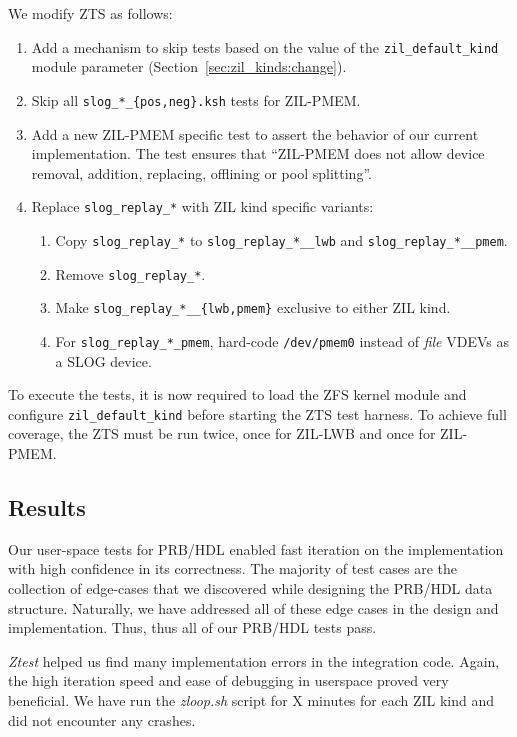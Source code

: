 \documentclass[12pt,a4paper,twoside]{book}
\begin{document}
We modify ZTS as follows:
\begin{enumerate}[noitemsep]
    \item Add a mechanism to skip tests based on the value of the \lstinline{zil_default_kind} module parameter (Section~\ref{sec:zil_kinds:change}).
    \item Skip all \lstinline|slog_*_{pos,neg}.ksh| tests for ZIL-PMEM.
    \item Add a new ZIL-PMEM specific test to assert the behavior of our current implementation.
        The test ensures that ``ZIL-PMEM does not allow device removal, addition, replacing, offlining or pool splitting''.
    \item Replace \lstinline{slog_replay_*} with ZIL kind specific variants:
        \begin{enumerate}
            \item Copy \lstinline{slog_replay_*} to \lstinline{slog_replay_*__lwb} and \lstinline{slog_replay_*__pmem}.
            \item Remove \lstinline{slog_replay_*}.
            \item Make \lstinline|slog_replay_*__{lwb,pmem}| exclusive to either ZIL kind.
            \item For \lstinline{slog_replay_*_pmem}, hard-code \lstinline{/dev/pmem0} instead of \textit{file} VDEVs as a SLOG device.
        \end{enumerate}
\end{enumerate}
To execute the tests, it is now required to load the ZFS kernel module and configure \lstinline{zil_default_kind} before starting the ZTS test harness.
To achieve full coverage, the ZTS must be run twice, once for ZIL-LWB and once for ZIL-PMEM.

\subsection{Results}

Our user-space tests for PRB/HDL enabled fast iteration on the implementation with high confidence in its correctness.
The majority of test cases are the collection of edge-cases that we discovered while designing the PRB/HDL data structure.
Naturally, we have addressed all of these edge cases in the design and implementation.
Thus, thus all of our PRB/HDL tests pass.

\textit{Ztest} helped us find many implementation errors in the integration code.
Again, the high iteration speed and ease of debugging in userspace proved very beneficial.
We have run the \textit{zloop.sh} script for X minutes for each ZIL kind and did not encounter any crashes.
\end{document}
